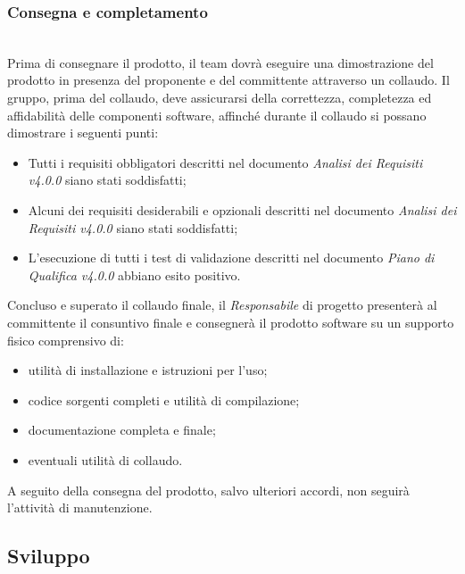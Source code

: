 \subsubsection{Consegna e completamento} \-\\
Prima di consegnare il prodotto, il team dovrà eseguire una dimostrazione del prodotto in presenza del proponente e del committente attraverso un collaudo. Il gruppo, prima del collaudo, deve assicurarsi della correttezza, completezza ed affidabilità delle componenti software, affinché durante il collaudo si possano dimostrare i seguenti punti:
\begin{itemize}
	\item Tutti i requisiti obbligatori descritti nel documento \textit{Analisi dei Requisiti v4.0.0} siano stati soddisfatti;
	\item Alcuni dei requisiti desiderabili e opzionali descritti nel documento \textit{Analisi dei Requisiti v4.0.0} siano stati soddisfatti;
	\item L'esecuzione di tutti i test di validazione descritti nel documento \textit{Piano di Qualifica v4.0.0} abbiano esito positivo.
\end{itemize} 
Concluso e superato il collaudo finale, il \textit{Responsabile} di progetto presenterà al committente il consuntivo finale e consegnerà il prodotto software su un supporto fisico comprensivo di:
\begin{itemize}
	\item utilità di installazione e istruzioni per l'uso;
	\item codice sorgenti completi e utilità di compilazione;
	\item documentazione completa e finale;
	\item eventuali utilità di collaudo. 
\end{itemize}
A seguito della consegna del prodotto, salvo ulteriori accordi, non seguirà l'attività
di manutenzione.


\subsection{Sviluppo}\label{Sviluppo}
